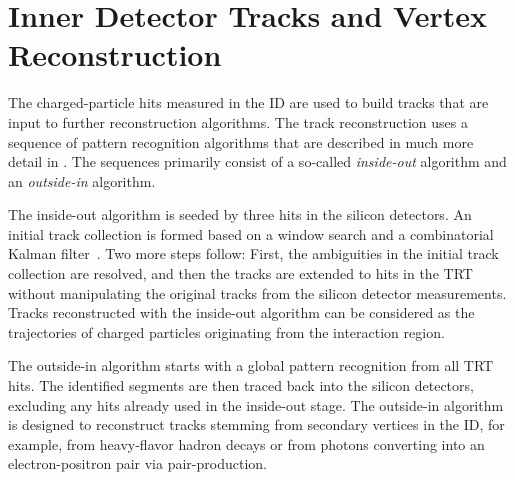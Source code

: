 \section{Inner Detector Tracks and Vertex Reconstruction}
The charged-particle hits measured in the ID are used to build tracks that are input to further reconstruction algorithms.
The track reconstruction uses a sequence of pattern recognition algorithms that are described in much more detail in . The sequences primarily consist of a so-called \emph{inside-out} algorithm and an \emph{outside-in} algorithm.

The inside-out algorithm is seeded by three hits in the silicon detectors. An initial track collection is formed based on a window search and a combinatorial Kalman filter~\cite{fruhwirth_application_1987}. Two more steps follow: First, the ambiguities in the initial track collection are resolved, and then the tracks are extended to hits in the TRT without manipulating the original tracks from the silicon detector measurements. Tracks reconstructed with the inside-out algorithm can be considered as the trajectories of charged particles originating from the interaction region.

The outside-in algorithm starts with a global pattern recognition from all TRT hits. The identified segments are then traced back into the silicon detectors, excluding any hits already used in the inside-out stage. The outside-in algorithm is designed to reconstruct tracks stemming from secondary vertices in the ID, for example, from heavy-flavor hadron decays or from photons converting into an electron-positron pair via pair-production.


